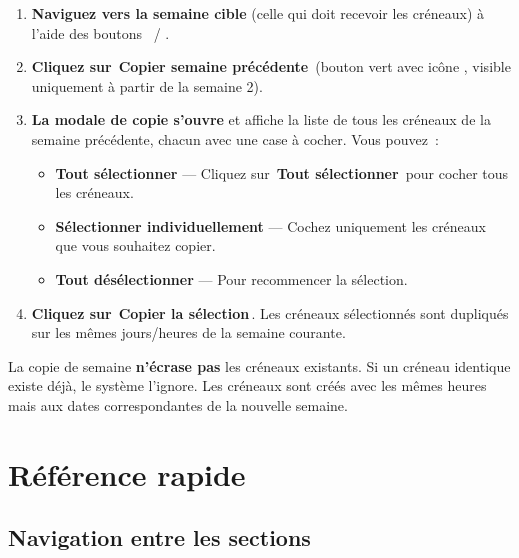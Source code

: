 \documentclass[12pt,a4paper]{report}
\newcommand{\bouton}[1]{{\colorbox{emerald}{\small\sffamily\bfseries\color{white}\,#1\,}}}
\begin{document}
\begin{etape}[title=Proc\'edure : Copier une semaine]
\begin{enumerate}[leftmargin=1.5cm,label=\textbf{\arabic*.},itemsep=10pt]
  \item \textbf{Naviguez vers la semaine cible} (celle qui doit recevoir les cr\'eneaux) \`a l'aide des boutons \faChevronLeft\ / \faChevronRight.

  \item \textbf{Cliquez sur} \bouton{Copier semaine pr\'ec\'edente} (bouton vert avec ic\^one \faCopy, visible uniquement \`a partir de la semaine 2).

  \item \textbf{La modale de copie s'ouvre} et affiche la liste de tous les cr\'eneaux de la semaine pr\'ec\'edente, chacun avec une case \`a cocher. Vous pouvez~:
  \begin{itemize}
    \item \textbf{Tout s\'electionner} --- Cliquez sur \bouton{Tout s\'electionner} pour cocher tous les cr\'eneaux.
    \item \textbf{S\'electionner individuellement} --- Cochez uniquement les cr\'eneaux que vous souhaitez copier.
    \item \textbf{Tout d\'es\'electionner} --- Pour recommencer la s\'election.
  \end{itemize}

  \item \textbf{Cliquez sur} \bouton{Copier la s\'election}. Les cr\'eneaux s\'electionn\'es sont dupliqu\'es sur les m\^emes jours/heures de la semaine courante.
\end{enumerate}
\end{etape}

\begin{danger}
La copie de semaine \textbf{n'\'ecrase pas} les cr\'eneaux existants. Si un cr\'eneau identique existe d\'ej\`a, le syst\`eme l'ignore. Les cr\'eneaux sont cr\'e\'es avec les m\^emes heures mais aux dates correspondantes de la nouvelle semaine.
\end{danger}

\newpage
\chapter{R\'ef\'erence rapide}

\section{Navigation entre les sections}
\end{document}
